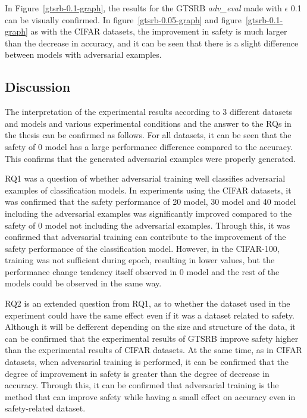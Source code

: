 \documentclass[journal,article,submit,moreauthors,pdftex]{Definitions/mdpi}
\begin{document}
In Figure~\ref{gtsrb-0.1-graph}, the results for the GTSRB {\it adv\_eval} made with \begin{math}\epsilon\end{math} 0.1 can be visually confirmed.
In figure~\ref{gtsrb-0.05-graph} and figure~\ref{gtsrb-0.1-graph} as with the CIFAR datasets, the improvement in safety is much larger than the decrease in accuracy, and it can be seen that there is a slight difference between models with adversarial examples.

\subsection{Discussion}

The interpretation of the experimental results according to 3 different datasets and models and various experimental conditions and the answer to the RQs in the thesis can be confirmed as follows.
For all datasets, it can be seen that the safety of 0 model has a large performance difference compared to the accuracy. This confirms that the generated adversarial examples were properly generated.

RQ1 was a question of whether adversarial training well classifies adversarial examples of classification models.
In experiments using the CIFAR datasets, it was confirmed that the safety performance of 20 model, 30 model and 40 model including the adversarial examples was significantly improved compared to the safety of 0 model not including the adversarial examples.
Through this, it was confirmed that adversarial training can contribute to the improvement of the safety performance of the classification model.
However, in the CIFAR-100, training was not sufficient during epoch, resulting in lower values, but the performance change tendency itself observed in 0 model and the rest of the models could be observed in the same way.

RQ2 is an extended question from RQ1, as to whether the dataset used in the experiment could have the same effect even if it was a dataset related to safety.
Although it will be defferent depending on the size and structure of the data, it can be confirmed that the experimental results of GTSRB improve safety higher than the experimental results of CIFAR datasets.
At the same time, as in CIFAR datasets, when adversarial training is performed, it can be confirmed that the degree of improvement in safety is greater than the degree of decrease in accuracy.
Through this, it can be confirmed that adversarial training is the method that can improve safety while having a small effect on accuracy even in safety-related dataset.
\end{document}
